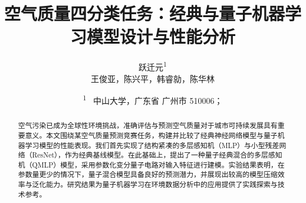 \documentclass[10pt,a4paper,twoside]{article}
\title{\heiti \zihao{-2} 空气质量四分类任务：经典与量子机器学习模型设计与性能分析}%
\author{\kaishu \zihao{4} 跃迁元\textsuperscript{1}\\王俊亚，陈兴平，韩睿勍，陈华林}%
\date{\textsuperscript{1}~{\kaishu \zihao{5} 中山大学，广东省 广州市 510006；} }%
\numberwithin{figure}{section}%
\numberwithin{table}{section}%
\begin{document}

\songti%

\maketitle%



\renewcommand{\abstractname}{\zihao{-5} \heiti \mdseries 摘\quad 要}
\begin{abstract}
    空气污染已成为全球性环境挑战，准确评估与预测空气质量对于城市可持续发展具有重要意义。本文围绕某空气质量预测竞赛任务，构建并比较了经典神经网络模型与量子机器学习模型的性能表现。我们首先实现了结构紧凑的多层感知机（MLP）与小型残差网络（ResNet），作为经典基线模型。在此基础上，提出了一种量子经典混合的多层感知机（QMLP）模型，采用参数化变分量子电路对输入特征进行建模。实验结果表明，在参数量更少的情况下，量子混合模型具备良好的预测潜力，并展现出较高的模型压缩效率与泛化能力。研究结果为量子机器学习在环境数据分析中的应用提供了实践探索与技术参考。
    \par {}
\end{abstract}
\end{document}
